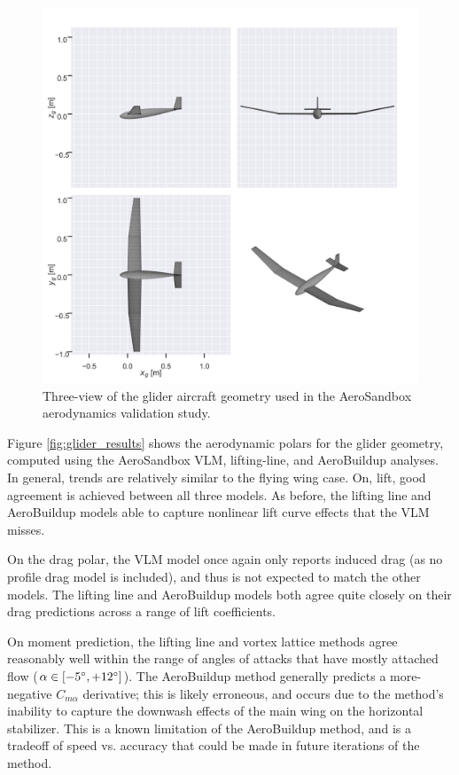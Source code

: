 \begin{figure}[H]
    \centering
    \includegraphics[width=5in]{../figures/aero_validation/glider_geometry.png}
    \caption{Three-view of the glider aircraft geometry used in the AeroSandbox aerodynamics validation study.}
    \label{fig:glider_geometry}
\end{figure}

Figure \ref{fig:glider_results} shows the aerodynamic polars for the glider geometry, computed using the AeroSandbox VLM, lifting-line, and AeroBuildup analyses. In general, trends are relatively similar to the flying wing case. On, lift, good agreement is achieved between all three models. As before, the lifting line and AeroBuildup models able to capture nonlinear lift curve effects that the VLM misses.

On the drag polar, the VLM model once again only reports induced drag (as no profile drag model is included), and thus is not expected to match the other models. The lifting line and AeroBuildup models both agree quite closely on their drag predictions across a range of lift coefficients.

On moment prediction, the lifting line and vortex lattice methods agree reasonably well within the range of angles of attacks that have mostly attached flow ($\alpha \in [-5\degree, +12\degree]$). The AeroBuildup method generally predicts a more-negative $C_{m\alpha}$ derivative; this is likely erroneous, and occurs due to the method's inability to capture the downwash effects of the main wing on the horizontal stabilizer. This is a known limitation of the AeroBuildup method, and is a tradeoff of speed vs. accuracy that could be made in future iterations of the method.

